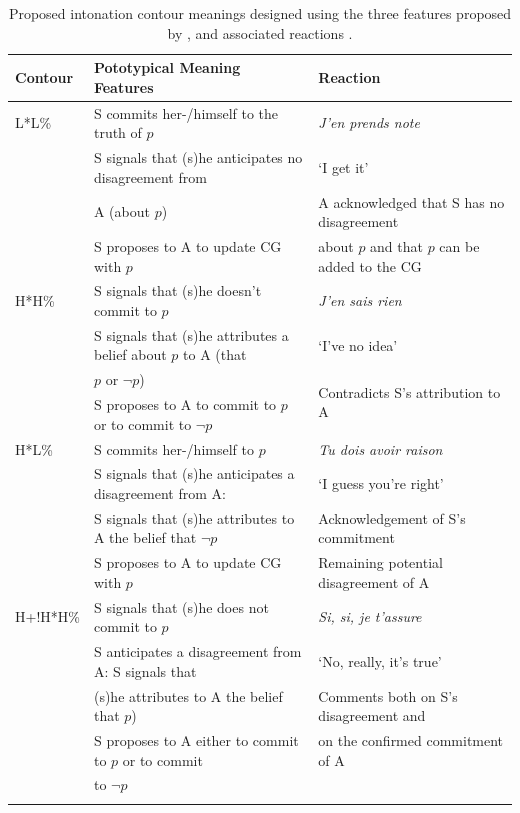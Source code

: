 \documentclass[output=paper,colorlinks,citecolor=brown]{langscibook}
\begin{document}
\begin{table}
\begin{tabularx}{\textwidth}{lll}
\lsptoprule
Contour & Pototypical Meaning Features & Reaction\\
\midrule
L*L\% & S commits her-/himself to the truth of $p$ & \textit{J'en prends note} \\
& S signals that (s)he anticipates no disagreement from & `I get it' \\
& A (about $p$) & A acknowledged that S has no disagreement \\
& S proposes to A to update CG with $p$ & about $p$ and that $p$ can be added to the CG \\
\midrule
H*H\%& S signals that (s)he doesn't commit to $p$ & \textit{J'en sais rien} \\
& S signals that (s)he attributes a belief about $p$ to A (that & `I've no idea'\\
& $p$ or $\neg p$) & \multirow{2}{*}{Contradicts S's attribution to A} \\
& S proposes to A to commit to $p$ or to commit to $\neg p$ & \\
\midrule
H*L\% & S commits her-/himself to $p$ & \textit{Tu dois avoir raison} \\
& S signals that (s)he anticipates a disagreement from A:  & `I guess you're right' \\
& S signals that (s)he attributes to A the belief that $\neg p$  & Acknowledgement of S's commitment \\
& S proposes to A to update CG with $p$ & Remaining potential disagreement of A \\
\midrule
H+!H*H\% & S signals that (s)he does not commit to $p$ & \textit{Si, si, je t'assure} \\
& S anticipates a disagreement from A: S signals that & `No, really, it's true' \\
& (s)he attributes to A the belief that $p$) & Comments both on S's disagreement and \\
& S proposes to A either to commit to $p$ or to commit & on the confirmed commitment of A\\
& to $\neg p$ & \\
\lspbottomrule
\end{tabularx}
\caption{Proposed intonation contour meanings designed using the three features proposed by \citet{beymar2007}, and associated reactions \citep[from][]{portesetal2014}.}
\label{table1}
\end{table}
\end{document}
